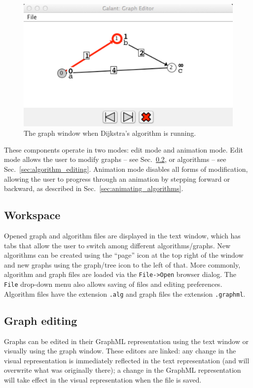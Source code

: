 \begin{figure}[p!]
\includegraphics[scale=0.5]{X_dijkstra_running}
\caption{The graph window when Dijkstra's algorithm is running.}
\label{fig:dijkstra_running}
\end{figure}

These components operate in two modes: edit mode and animation mode.
Edit mode allows the user to modify graphs -- see Sec.~\ref{sec:graph_editing},
or algorithms -- see Sec.~\ref{sec:algorithm_editing}. Animation mode disables all forms of modification, allowing the user to progress through
an animation by stepping forward or backward, as described in
Sec.~\ref{sec:animating_algorithms}.

\subsection{Workspace}

Opened graph and algorithm files are displayed in the text window,
which has tabs that allow the user to switch among different algorithms/graphs.
New algorithms can be created using the ``page'' icon at the top right of the
window and new graphs using the graph/tree icon to the left of that.
More commonly, algorithm and graph files are loaded via the \texttt{File->Open}
browser dialog. The \texttt{File} drop-down menu also allows saving of files
and editing preferences. Algorithm files have the extension \texttt{.alg}
and graph files the extension \texttt{.graphml}.

\subsection{Graph editing}
\label{sec:graph_editing}

Graphs can be edited in their GraphML representation using the text window
or visually using the graph window.
These editors are linked:
any change in the visual representation is immediately reflected in the text
representation (and will overwrite what was originally there);
a change in the GraphML representation will take effect in the visual representation
when the file is saved.


